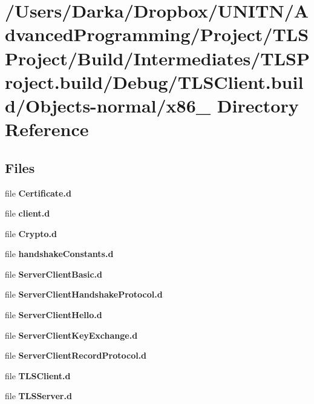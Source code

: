 \section{/\+Users/\+Darka/\+Dropbox/\+U\+N\+I\+T\+N/\+Advanced\+Programming/\+Project/\+T\+L\+S\+Project/\+Build/\+Intermediates/\+T\+L\+S\+Project.build/\+Debug/\+T\+L\+S\+Client.build/\+Objects-\/normal/x86\+\_ Directory Reference}
\label{dir_22fcc81124e57bfe320a4bab19f869b3}
\subsection*{Files}
\begin{DoxyCompactItemize}
\item 
file {\bf Certificate.\+d}
\item 
file {\bf client.\+d}
\item 
file {\bf Crypto.\+d}
\item 
file {\bf handshake\+Constants.\+d}
\item 
file {\bf Server\+Client\+Basic.\+d}
\item 
file {\bf Server\+Client\+Handshake\+Protocol.\+d}
\item 
file {\bf Server\+Client\+Hello.\+d}
\item 
file {\bf Server\+Client\+Key\+Exchange.\+d}
\item 
file {\bf Server\+Client\+Record\+Protocol.\+d}
\item 
file {\bf T\+L\+S\+Client.\+d}
\item 
file {\bf T\+L\+S\+Server.\+d}
\end{DoxyCompactItemize}
